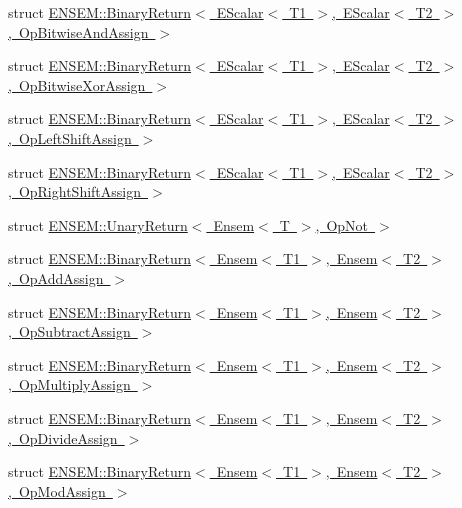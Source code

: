 \begin{DoxyCompactItemize}
\item 
struct \mbox{\hyperlink{structENSEM_1_1BinaryReturn_3_01EScalar_3_01T1_01_4_00_01EScalar_3_01T2_01_4_00_01OpBitwiseAndAssign_01_4}{E\+N\+S\+E\+M\+::\+Binary\+Return$<$ E\+Scalar$<$ T1 $>$, E\+Scalar$<$ T2 $>$, Op\+Bitwise\+And\+Assign $>$}}
\item 
struct \mbox{\hyperlink{structENSEM_1_1BinaryReturn_3_01EScalar_3_01T1_01_4_00_01EScalar_3_01T2_01_4_00_01OpBitwiseXorAssign_01_4}{E\+N\+S\+E\+M\+::\+Binary\+Return$<$ E\+Scalar$<$ T1 $>$, E\+Scalar$<$ T2 $>$, Op\+Bitwise\+Xor\+Assign $>$}}
\item 
struct \mbox{\hyperlink{structENSEM_1_1BinaryReturn_3_01EScalar_3_01T1_01_4_00_01EScalar_3_01T2_01_4_00_01OpLeftShiftAssign_01_4}{E\+N\+S\+E\+M\+::\+Binary\+Return$<$ E\+Scalar$<$ T1 $>$, E\+Scalar$<$ T2 $>$, Op\+Left\+Shift\+Assign $>$}}
\item 
struct \mbox{\hyperlink{structENSEM_1_1BinaryReturn_3_01EScalar_3_01T1_01_4_00_01EScalar_3_01T2_01_4_00_01OpRightShiftAssign_01_4}{E\+N\+S\+E\+M\+::\+Binary\+Return$<$ E\+Scalar$<$ T1 $>$, E\+Scalar$<$ T2 $>$, Op\+Right\+Shift\+Assign $>$}}
\item 
struct \mbox{\hyperlink{structENSEM_1_1UnaryReturn_3_01Ensem_3_01T_01_4_00_01OpNot_01_4}{E\+N\+S\+E\+M\+::\+Unary\+Return$<$ Ensem$<$ T $>$, Op\+Not $>$}}
\item 
struct \mbox{\hyperlink{structENSEM_1_1BinaryReturn_3_01Ensem_3_01T1_01_4_00_01Ensem_3_01T2_01_4_00_01OpAddAssign_01_4}{E\+N\+S\+E\+M\+::\+Binary\+Return$<$ Ensem$<$ T1 $>$, Ensem$<$ T2 $>$, Op\+Add\+Assign $>$}}
\item 
struct \mbox{\hyperlink{structENSEM_1_1BinaryReturn_3_01Ensem_3_01T1_01_4_00_01Ensem_3_01T2_01_4_00_01OpSubtractAssign_01_4}{E\+N\+S\+E\+M\+::\+Binary\+Return$<$ Ensem$<$ T1 $>$, Ensem$<$ T2 $>$, Op\+Subtract\+Assign $>$}}
\item 
struct \mbox{\hyperlink{structENSEM_1_1BinaryReturn_3_01Ensem_3_01T1_01_4_00_01Ensem_3_01T2_01_4_00_01OpMultiplyAssign_01_4}{E\+N\+S\+E\+M\+::\+Binary\+Return$<$ Ensem$<$ T1 $>$, Ensem$<$ T2 $>$, Op\+Multiply\+Assign $>$}}
\item 
struct \mbox{\hyperlink{structENSEM_1_1BinaryReturn_3_01Ensem_3_01T1_01_4_00_01Ensem_3_01T2_01_4_00_01OpDivideAssign_01_4}{E\+N\+S\+E\+M\+::\+Binary\+Return$<$ Ensem$<$ T1 $>$, Ensem$<$ T2 $>$, Op\+Divide\+Assign $>$}}
\item 
struct \mbox{\hyperlink{structENSEM_1_1BinaryReturn_3_01Ensem_3_01T1_01_4_00_01Ensem_3_01T2_01_4_00_01OpModAssign_01_4}{E\+N\+S\+E\+M\+::\+Binary\+Return$<$ Ensem$<$ T1 $>$, Ensem$<$ T2 $>$, Op\+Mod\+Assign $>$}}

\end{DoxyCompactItemize}
